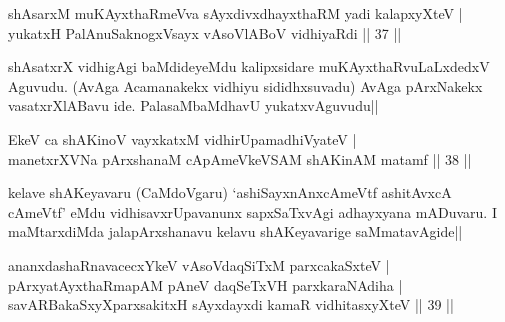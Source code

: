 \begin{shl}
shAsarxM muKAyxthaRmeVva sAyxdivxdhayxthaRM yadi kalapxyXteV | \\
yukatxH PalAnuSaknogxV\s sayx vAsoVlABoV vidhiyaRdi \hfill|| 37 || 
\end{shl}

\begin{artha}
shAsatxrX vidhigAgi baMdideyeMdu kalipxsidare muKAyxthaRvuLaLxdedxV 
Aguvudu. (AvAga Acamanakekx vidhiyu sididhxsuvadu) AvAga pArxNakekx 
vasatxrXlABavu ide. PalasaMbaMdhavU yukatxvAguvudu||
\end{artha}

\begin{shl}
EkeV ca shAKinoV vayxkatxM vidhirUpamadhiVyateV | \\
manetxrXVNa pArxshanaM cApAmeVkeVSAM shAKinAM matamf \hfill|| 38 || 
\end{shl}

\begin{artha}
kelave shAKeyavaru (CaMdoVgaru) `ashiSayxnAnxcAmeVtf ashitAvxcA 
cAmeVtf' eMdu vidhisavxrUpavanunx sapxSaTxvAgi adhayxyana mADuvaru. I 
maMtarxdiMda jalapArxshanavu kelavu shAKeyavarige saMmatavAgide||
\end{artha}

\begin{shl}
ananxdashaRnavacecxYkeV vAsoVdaqSiTxM parxcakaSxteV | \\
pArxyatAyxthaRmapAM pAneV daqSeTxVH parxkaraNAdiha | \\
savARBakaSxyXparxsakitxH sAyxdayxdi kamaR vidhitasxyXteV \hfill|| 39 || 
\end{shl}

